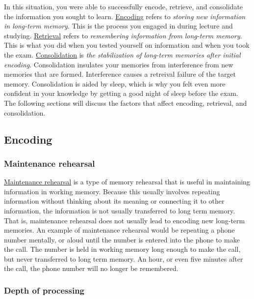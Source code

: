 \documentclass[
]{krantz}
\begin{document}
In this situation, you were able to successfully encode, retrieve, and consolidate the information you sought to learn. \hyperref[encoding]{Encoding} refers to \emph{storing new information in long-term memory}. This is the process you engaged in during lecture and studying. \hyperref[retrieval]{Retrieval} refers to \emph{remembering information from long-term memory}. This is what you did when you tested yourself on information and when you took the exam. \hyperref[consolidation]{Consolidation} is \emph{the stabilization of long-term memories after initial encoding}. Consolidation insulates your memories from interference from new memories that are formed. Interference causes a retreival failure of the target memory. Consolidation is aided by sleep, which is why you felt even more confident in your knowledge by getting a good night of sleep before the exam. The following sections will discuss the factors that affect encoding, retrieval, and consolidation.

\subsection*{Encoding}\label{encoding}


\subsubsection*{Maintenance rehearsal}\label{maintenance-rehearsal}


\hyperref[maintenance-rehearsal]{Maintenance rehearsal} is a type of memory rehearsal that is useful in maintaining information in working memory. Because this usually involves repeating information without thinking about its meaning or connecting it to other information, the information is not usually transferred to long term memory. That is, maintenance rehearsal does not usually lead to encoding new long-term memories. An example of maintenance rehearsal would be repeating a phone number mentally, or aloud until the number is entered into the phone to make the call. The number is held in working memory long enough to make the call, but never transferred to long term memory. An hour, or even five minutes after the call, the phone number will no longer be remembered.

\subsubsection*{Depth of processing}\label{depth-of-processing}
\end{document}
